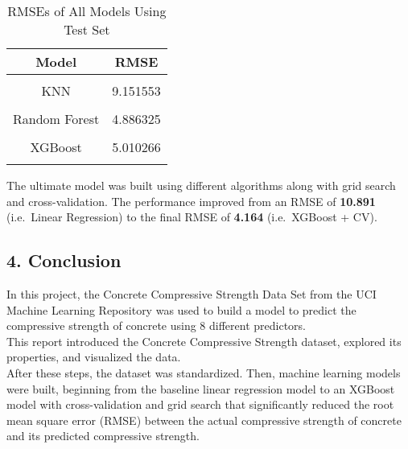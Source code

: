 \documentclass[
]{article}
\begin{document}
\begin{table}[H]

\caption{\label{tab:Table 7: Results Table for All models}RMSEs of All Models Using Test Set}
\centering
\fontsize{13}{15}\selectfont
\begin{tabular}[t]{|>{}c|||>{}c|}
\hline
Model & RMSE\\
\hline
\cellcolor{gray!6}{Linear Regression} & \cellcolor{gray!6}{10.891350}\\
\hline
KNN & 9.151553\\
\hline
\cellcolor{gray!6}{KNN+CV} & \cellcolor{gray!6}{8.870900}\\
\hline
Random Forest & 4.886325\\
\hline
\cellcolor{gray!6}{Random Forest+CV} & \cellcolor{gray!6}{4.784191}\\
\hline
XGBoost & 5.010266\\
\hline
\cellcolor{gray!6}{XGBoost+CV} & \cellcolor{gray!6}{4.163971}\\
\hline
\end{tabular}
\end{table}

The ultimate model was built using different algorithms along with grid
search and cross-validation. The performance improved from an RMSE of
\textbf{10.891} (i.e.~Linear Regression) to the final RMSE of
\textbf{4.164} (i.e.~XGBoost + CV).

\hypertarget{conclusion}{%
\subsection{4. Conclusion}\label{conclusion}}

In this project, the Concrete Compressive Strength Data Set from the UCI
Machine Learning Repository was used to build a model to predict the
compressive strength of concrete using 8 different predictors.\\

This report introduced the Concrete Compressive Strength dataset,
explored its properties, and visualized the data.\\

After these steps, the dataset was standardized. Then, machine learning
models were built, beginning from the baseline linear regression model
to an XGBoost model with cross-validation and grid search that
significantly reduced the root mean square error (RMSE) between the
actual compressive strength of concrete and its predicted compressive
strength.\\
\end{document}
